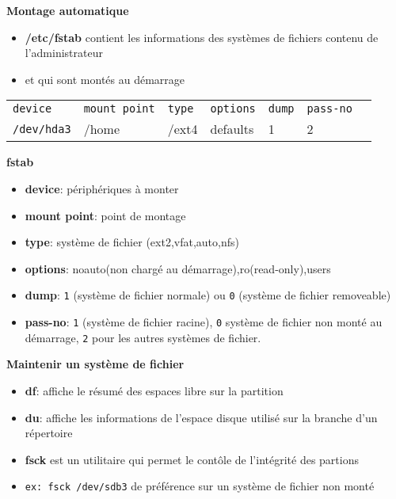 \documentclass[french]{beamer}
\begin{document}
\begin{frame}
\textbf{Montage automatique}
\begin{itemize}
\item \textbf{/etc/fstab} contient les informations des systèmes de fichiers
contenu de l'administrateur
\item et qui sont montés au démarrage
\end{itemize}
\begin{tabular}{l l l l l l l}
\texttt{device} & \texttt{mount point} & \texttt{type} &
\texttt{options} & \texttt{dump} & \texttt{pass-no}\\
\texttt{/dev/hda3} & /home & /ext4 & defaults & 1 & 2
\end{tabular}
\end{frame}

\begin{frame}
\textbf{fstab}
\begin{itemize}
\item \textbf{device}: périphériques à monter
\item \textbf{mount point}: point de montage
\item \textbf{type}: système de fichier (ext2,vfat,auto,nfs)
\item \textbf{options}: noauto(non chargé au démarrage),ro(read-only),users
\item \textbf{dump}: \texttt{1} (système de fichier normale) ou \texttt{0}
(système de fichier removeable)
\item \textbf{pass-no}: \texttt{1} (système de fichier racine), \texttt{0}
système de fichier non monté au démarrage, \texttt{2} pour les autres systèmes
de fichier.
\end{itemize}
\end{frame}

\begin{frame}
\textbf{Maintenir un système de fichier}
\begin{itemize}
\item \textbf{df}: affiche le résumé des espaces libre sur la partition
\item \textbf{du}: affiche les informations de l'espace disque utilisé sur la
branche d'un répertoire
\item \textbf{fsck} est un utilitaire qui permet le contôle de l'intégrité des
partions
\item \texttt{ex: fsck /dev/sdb3} de préférence sur un système de fichier non
monté
\end{itemize}
\end{frame}
\end{document}
